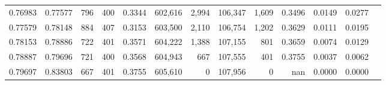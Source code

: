 \begin{tabular}{rrrrrrrrrrrrr}
0.76983 & 0.77577 &   796 & 400 &                                     0.3344 & 602,616 &   2,994 & 106,347 &   1,609 & 0.3496 & 0.0149 & 0.0277 \\
0.77579 & 0.78148 &   884 & 407 &                                     0.3153 & 603,500 &   2,110 & 106,754 &   1,202 & 0.3629 & 0.0111 & 0.0195 \\
0.78153 & 0.78886 &   722 & 401 &                                     0.3571 & 604,222 &   1,388 & 107,155 &     801 & 0.3659 & 0.0074 & 0.0129 \\
0.78887 & 0.79696 &   721 & 400 &                                     0.3568 & 604,943 &     667 & 107,555 &     401 & 0.3755 & 0.0037 & 0.0062 \\
0.79697 & 0.83803 &   667 & 401 &                                     0.3755 & 605,610 &       0 & 107,956 &       0 &    nan & 0.0000 & 0.0000 \\
\bottomrule
\end{tabular}
